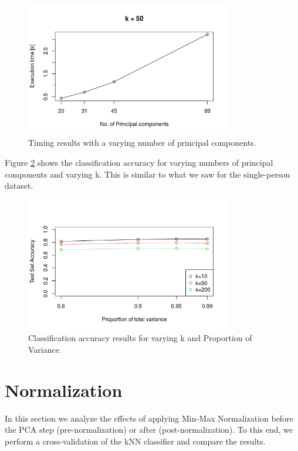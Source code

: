 \documentclass[paper=a4, fontsize=11pt]{scrartcl} %
\begin{document}
\begin{figure}[h]
	\centering
	\includegraphics[width=0.8\textwidth]{timing_m.png}
	\caption{Timing results with a varying number of principal components.}
	\label{fig:timing_m}
\end{figure}

Figure \ref{fig:acc_m} shows the classification accuracy for varying numbers of principal components and varying k. This is similar to what we saw for the single-person dataset.%

\begin{figure}[h]
	\centering
	\includegraphics[width=0.8\textwidth]{accuracy2_m.png}
	\caption{Classification accuracy results for varying k and Proportion of Variance.}
	\label{fig:acc_m}
\end{figure}

\clearpage
\section{Normalization}
In this section we analyze the effects of applying Min-Max Normalization before the PCA step (pre-normalization) or after (post-normalization). To this end, we perform a cross-validation of the kNN classifier and compare the results.\par
\end{document}
